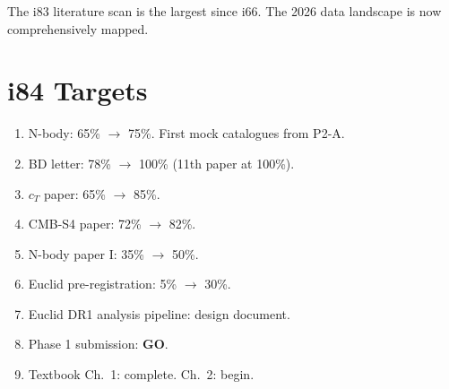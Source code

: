 \documentclass[11pt,a4paper]{article}
\begin{document}
The i83 literature scan is the largest since i66. The 2026 data landscape is now comprehensively mapped.

\section{i84 Targets}

\begin{enumerate}[nosep]
\item N-body: 65\% $\to$ 75\%. First mock catalogues from P2-A.
\item BD letter: 78\% $\to$ 100\% (11th paper at 100\%).
\item $c_T$ paper: 65\% $\to$ 85\%.
\item CMB-S4 paper: 72\% $\to$ 82\%.
\item N-body paper I: 35\% $\to$ 50\%.
\item Euclid pre-registration: 5\% $\to$ 30\%.
\item Euclid DR1 analysis pipeline: design document.
\item Phase 1 submission: \textbf{GO}.
\item Textbook Ch.\ 1: complete. Ch.\ 2: begin.
\end{enumerate}
\end{document}
